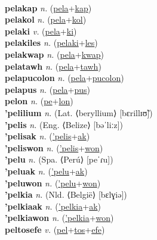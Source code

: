  \label{pelafut} \\
\textbf{pelakap} \textit{n.} (\hyperref[pela]{pela}+\hyperref[kap]{kap})
 \label{pelakap} \\
\textbf{pelakol} \textit{n.} (\hyperref[pela]{pela}+\hyperref[kol]{kol})
 \label{pelakol} \\
\textbf{pelaki} \textit{v.} (\hyperref[pela]{pela}+\hyperref[ki]{ki})
 \label{pelaki} \\
\textbf{pelakiles} \textit{n.} (\hyperref[pelaki]{pelaki}+\hyperref[les]{les})
 \label{pelakiles} \\
\textbf{pelakwap} \textit{n.} (\hyperref[pela]{pela}+\hyperref[kwap]{kwap})
 \label{pelakwap} \\
\textbf{pelatawh} \textit{n.} (\hyperref[pela]{pela}+\hyperref[tawh]{tawh})
 \label{pelatawh} \\
\textbf{pelapucolon} \textit{n.} (\hyperref[pela]{pela}+\hyperref[pucolon]{pucolon})
 \label{pelapucolon} \\
\textbf{pelapus} \textit{n.} (\hyperref[pela]{pela}+\hyperref[pus]{pus})
 \label{pelapus} \\
\textbf{pelon} \textit{n.} (\hyperref[pe]{pe}+\hyperref[lon]{lon})
 \label{pelon} \\
\textbf{'pelilium} \textit{n.} (Lat. ⟨beryllium⟩ [bɛrillɪʊ̃])
 \label{'pelilium} \\
\textbf{'pelis} \textit{n.} (Eng. ⟨Belize⟩ [bəˈliːz])
 \label{'pelis} \\
\textbf{'pelisak} \textit{n.} (\hyperref['pelis]{'pelis}+\hyperref[ak]{ak})
 \label{'pelisak} \\
\textbf{'peliswon} \textit{n.} (\hyperref['pelis]{'pelis}+\hyperref[won]{won})
 \label{'peliswon} \\
\textbf{'pelu} \textit{n.} (Spa. ⟨Perú⟩ [peˈɾu])
 \label{'pelu} \\
\textbf{'peluak} \textit{n.} (\hyperref['pelu]{'pelu}+\hyperref[ak]{ak})
 \label{'peluak} \\
\textbf{'peluwon} \textit{n.} (\hyperref['pelu]{'pelu}+\hyperref[won]{won})
 \label{'peluwon} \\
\textbf{'pelkia} \textit{n.} (Nld. ⟨België⟩ [bɛlɣiə])
 \label{'pelkia} \\
\textbf{'pelkiaak} \textit{n.} (\hyperref['pelkia]{'pelkia}+\hyperref[ak]{ak})
 \label{'pelkiaak} \\
\textbf{'pelkiawon} \textit{n.} (\hyperref['pelkia]{'pelkia}+\hyperref[won]{won})
 \label{'pelkiawon} \\
\textbf{peltosefe} \textit{v.} (\hyperref[pel]{pel}+\hyperref[tos]{tos}+\hyperref[efe]{efe})
